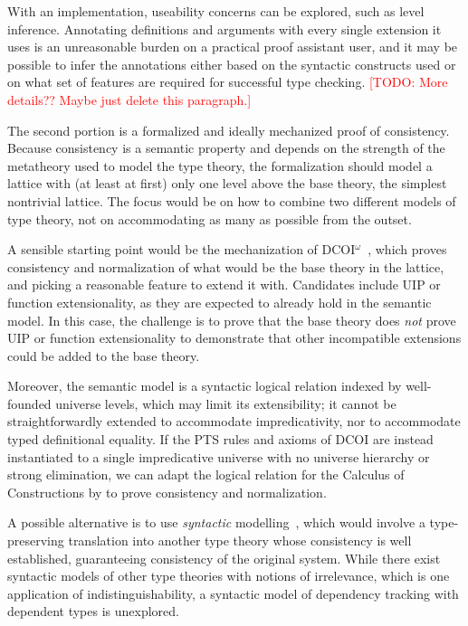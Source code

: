 \documentclass{article}
\newcommand{\note}[1]{\textcolor{red}{[#1]}}
\begin{document}
With an implementation, useability concerns can be explored,
such as level inference.
Annotating definitions and arguments with every single extension it uses
is an unreasonable burden on a practical proof assistant user,
and it may be possible to infer the annotations
either based on the syntactic constructs used
or on what set of features are required for successful type checking.
\note{TODO: More details?? Maybe just delete this paragraph.}

The second portion is a formalized and ideally mechanized proof of consistency.
Because consistency is a semantic property and depends on the strength
of the metatheory used to model the type theory,
the formalization should model a lattice with (at least at first)
only one level above the base theory, the simplest nontrivial lattice.
The focus would be on how to combine two different models of type theory,
not on accommodating as many as possible from the outset.

A sensible starting point would be the mechanization of DCOI$^\omega$~\cite{dcoi-omega},
which proves consistency and normalization of what would be the base theory in the lattice,
and picking a reasonable feature to extend it with.
Candidates include UIP or function extensionality,
as they are expected to already hold in the semantic model.
In this case, the challenge is to prove that the base theory does \emph{not}
prove UIP or function extensionality to demonstrate that
other incompatible extensions could be added to the base theory.

Moreover, the semantic model is a syntactic logical relation
indexed by well-founded universe levels,
which may limit its extensibility;
it cannot be straightforwardly extended to accommodate impredicativity,
nor to accommodate typed definitional equality.
If the PTS rules and axioms of DCOI are instead instantiated to
a single impredicative universe with no universe hierarchy or strong elimination,
we can adapt the logical relation for the Calculus of Constructions by \citet{cc}
to prove consistency and normalization.

A possible alternative is to use \emph{syntactic} modelling~\citep{syntactic},
which would involve a type-preserving translation into another type theory
whose consistency is well established,
guaranteeing consistency of the original system.
While there exist syntactic models of other type theories \citep{sprop,ghosts}
with notions of irrelevance, which is one application of indistinguishability,
a syntactic model of dependency tracking with dependent types is unexplored.
\end{document}
